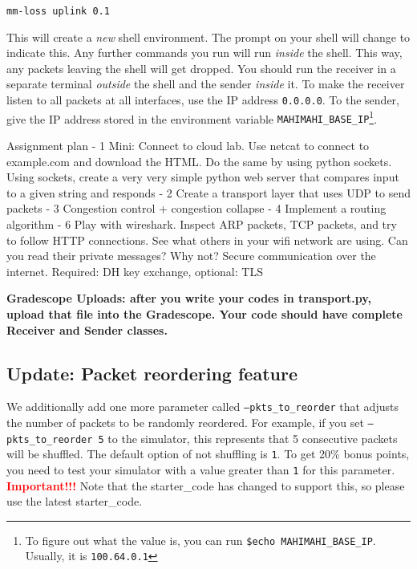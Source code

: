\documentclass{article}
\begin{document}
\begin{verbatim}
mm-loss uplink 0.1
\end{verbatim}

This will create a \emph{new} shell environment. The prompt on your shell will change to indicate this. Any further commands you run will run \emph{inside} the shell. This way, any packets leaving the shell will get dropped. You should run the receiver in a separate terminal \emph{outside} the shell and the sender \emph{inside} it. To make the receiver listen to all packets at all interfaces, use the IP address {\tt 0.0.0.0}. To the sender, give the IP address stored in the environment variable {\tt MAHIMAHI\_BASE\_IP}\footnote{To figure out what the value is, you can run {\tt \$echo MAHIMAHI\_BASE\_IP}. Usually, it is {\tt 100.64.0.1}}.

  Assignment plan
  - 1 Mini: Connect to cloud lab. Use netcat to connect to example.com and download the HTML. Do the same by using python sockets. Using sockets, create a very very simple python web server that compares input to a given string and responds
  - 2 Create a transport layer that uses UDP to send packets
  - 3 Congestion control + congestion collapse
  - 4 Implement a routing algorithm
  - 6 Play with wireshark. Inspect ARP packets, TCP packets, and try to follow HTTP connections. See what others in your wifi network are using. Can you read their private messages? Why not? Secure communication over the internet. Required: DH key exchange, optional: TLS
\fi

\noindent\textbf{Gradescope Uploads: after you write your codes in transport.py, upload that file into the Gradescope. Your code should have complete Receiver and Sender classes.}

\subsection{Update: Packet reordering feature}
We additionally add one more parameter called {\tt --pkts\_to\_reorder} that adjusts the number of packets to be randomly reordered. For example, if you set {\tt --pkts\_to\_reorder 5} to the simulator, this represents that 5 consecutive packets will be shuffled. The default option of not shuffling is {\tt 1}. To get 20\% bonus points, you need to test your simulator with a value greater than {\tt 1} for this parameter. \textbf{\textcolor{red}{Important!!!}} Note that the {starter\_code} has changed to support this, so please use the latest {starter\_code}.
\end{document}
